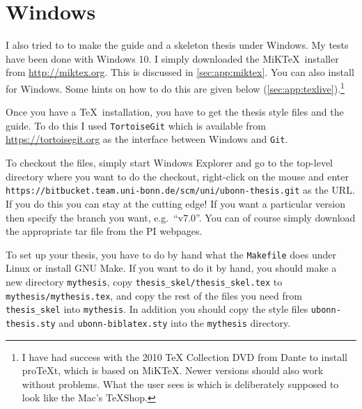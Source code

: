 

\section{Windows}%
\label{sec:app:windows}

I also tried to to make the guide and a skeleton thesis under Windows. 
My tests have been done with Windows 10.
I simply downloaded the MiK\TeX\ installer from \url{http://miktex.org}.
This is discussed in \cref{sec:app:miktex}.
You can also install \TeXLive for Windows. Some hints on how to do
this are given below (\cref{sec:app:texlive}).\footnote{%
I have had success with the 2010 \TeX{} Collection DVD from Dante to install
pro\TeX t, which is based on MiK\TeX.
Newer versions should also work without problems.
What the user sees is \TeXworks
which is deliberately supposed to look like the Mac's \TeX Shop.}

Once you have a \TeX\ installation, you have to get the thesis style files and the guide.
To do this I used \texttt{TortoiseGit} which is available from
\url{https://tortoisegit.org} as the interface between Windows and
\texttt{Git}.

To checkout the files, simply start Windows Explorer and go to the
top-level directory where you want to do the checkout, right-click on
the mouse and enter\\
\texttt{https://bitbucket.team.uni-bonn.de/scm/uni/ubonn-thesis.git}
as the URL\@.
If you do this you can stay at the cutting edge!
If you want a particular version then specify the branch you want, e.g.\ \enquote{v7.0}.
You can of course simply download the appropriate tar file from the PI webpages.

To set up your thesis, you have to do by hand what the
\texttt{Makefile} does under Linux or install GNU Make.
If you want to do it by hand, you should make a new directory
\texttt{mythesis}, copy \texttt{thesis\_skel/thesis\_skel.tex} to
\texttt{mythesis/mythesis.tex}, and copy the rest of the files you need from
\texttt{thesis\_skel} into \texttt{mythesis}. In addition you should
copy the style files \texttt{ubonn-thesis.sty} and \texttt{ubonn-biblatex.sty} into the
\texttt{mythesis} directory.

